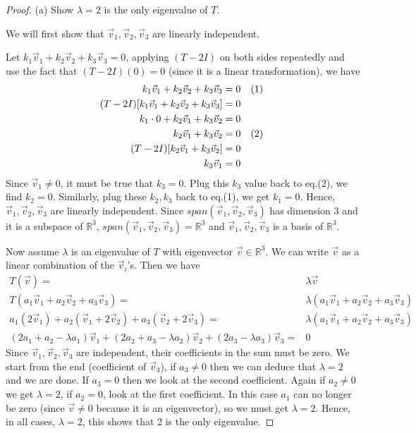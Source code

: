 \documentclass{article}
\begin{document}
\begin{proof}
(a) Show $\lambda =2$ is the only eigenvalue of $T$.
\smallskip

We will first show that $\vec{v}_1, \vec{v}_2, \vec{v}_3$ are linearly independent.

Let $k_1 \vec{v}_1 + k_2 \vec{v}_2 + k_3 \vec{v}_3 = 0$, applying $(T-2I)$ on both sides repeatedly and use the fact that $(T-2I)(0) = 0$ (since it is a linear transformation), we have
\begin{align*}
k_1 \vec{v}_1 + k_2 \vec{v}_2 + k_3 \vec{v}_3 &= 0  \text{\quad (1) }\\
(T-2I)[k_1 \vec{v}_1 + k_2 \vec{v}_2 + k_3 \vec{v}_3] &= 0 \\
k_1 \cdot 0 + k_2 \vec{v}_1 + k_3 \vec{v}_2 &= 0 \\
 k_2 \vec{v}_1 + k_3 \vec{v}_2 &= 0 \text{\quad (2) }\\
(T-2I)[ k_2 \vec{v}_1 + k_3 \vec{v}_2] &= 0 \\
k_3\vec{v}_1 &= 0
\end{align*}
Since $\vec{v}_1 \ne 0$, it must be true that $k_3 = 0$. Plug this $k_3$ value back to eq.(2), we find $k_2=0$. Similarly, plug these $k_2,k_3$ back to eq.(1), we get $k_1=0$. Hence, $\vec{v}_1, \vec{v}_2, \vec{v}_3$ are linearly independent. Since $span(\vec{v}_1, \vec{v}_2, \vec{v}_3)$ has dimension 3 and it is a subspace of $\mathbb{R}^3$, $span(\vec{v}_1, \vec{v}_2, \vec{v}_3) = \mathbb{R}^3$ and $\vec{v}_1, \vec{v}_2, \vec{v}_3$ is a basis of $\mathbb{R}^3$.
\medskip

Now assume $\lambda$ is an eigenvalue of $T$ with eigenvector $\vec{v} \in \mathbb{R}^3$. We can write $\vec{v}$ as a linear combination of the $\vec{v}_i$'s. Then we have
\begin{align*}
T(\vec{v}) =& \lambda \vec{v} \\
T(a_1 \vec{v}_1+ a_2 \vec{v}_2 + a_3 \vec{v}_3) =& \lambda (a_1 \vec{v}_1+ a_2 \vec{v}_2 + a_3 \vec{v}_3)\\
a_1( 2\vec{v}_1  )+ a_2(\vec{v}_1 +2\vec{v}_2) +a_3(\vec{v}_2+2\vec{v}_3) =& \lambda (a_1 \vec{v}_1+ a_2 \vec{v}_2 + a_3 \vec{v}_3)\\
(2a_1+a_2-\lambda a_1) \vec{v}_1 + (2a_2+a_3 -\lambda a_2)\vec{v}_2 +(2a_3-\lambda a_3)\vec{v}_3 =& 0 
\end{align*}
Since $\vec{v}_1, \vec{v}_2,\vec{v}_3$ are independent, their coefficients in the sum must be zero. We start from the end (coefficient of $\vec{v}_3$), if $a_3 \ne 0$ then we can deduce that $\lambda =2$ and we are done. If $a_3 =0$ then we look at the second coefficient. Again if $a_2 \ne 0$ we get $\lambda =2 $, if $a_2 = 0$, look at the first coefficient. In this case $a_1$ can no longer be zero (since $\vec{v} \ne 0$ because it is an eigenvector), so we must get $\lambda =2 $. Hence, in all cases, $\lambda =2 $, this shows that 2 is the only eigenvalue.
\bigskip


\end{proof}
\end{document}
